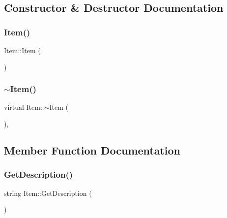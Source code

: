 \subsection{Constructor \& Destructor Documentation}
\mbox{\label{class_item_a297720c02984eab37332ae795d22189d}} 
\subsubsection{\texorpdfstring{Item()}{Item()}}
{\footnotesize\ttfamily Item\+::\+Item (\begin{DoxyParamCaption}{ }\end{DoxyParamCaption})\hspace{0.3cm}{\ttfamily [inline]}}

\mbox{\label{class_item_a33cc9c0bc556b5a33a9d0d58d37c602b}} 
\subsubsection{\texorpdfstring{$\sim$\+Item()}{~Item()}}
{\footnotesize\ttfamily virtual Item\+::$\sim$\+Item (\begin{DoxyParamCaption}{ }\end{DoxyParamCaption})\hspace{0.3cm}{\ttfamily [inline]}, {\ttfamily [virtual]}}



\subsection{Member Function Documentation}
\mbox{\label{class_item_a1d6f84eec4fee86d5d6c4be99152c86c}} 
\subsubsection{\texorpdfstring{Get\+Description()}{GetDescription()}}
{\footnotesize\ttfamily string Item\+::\+Get\+Description (\begin{DoxyParamCaption}{ }\end{DoxyParamCaption})\hspace{0.3cm}{\ttfamily [virtual]}}



